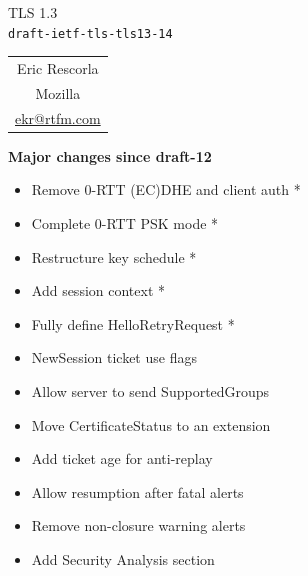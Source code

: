 \documentclass[helvetica]{seminar}
\newcommand{\heading}[1]{%
  \begin{center} 
    \large\bf 
    #1 
  \end{center} 
  \vspace{.4 in}}
\begin{document}
\begin{slide}
\begin{center}
\vspace{.5 in}
\LARGE{{\bf}TLS 1.3\\{\small \verb^draft-ietf-tls-tls13-14^}}\\
\vspace{.2in}
\large{
\begin{tabular}{c}
Eric Rescorla\\
Mozilla\\
\url{ekr@rtfm.com}
\end{tabular}
}
\end{center}
\end{slide}

\centerslidesfalse 

\begin{slide}
\heading{Major changes since draft-12}

\vspace{-8ex}
\begin{itemize}
\item Remove 0-RTT (EC)DHE and client auth *
\item Complete 0-RTT PSK mode *
\item Restructure key schedule *
\item Add session context *
\item Fully define HelloRetryRequest *
\item NewSession ticket use flags
\item Allow server to send SupportedGroups
\item Move CertificateStatus to an extension
\item Add ticket age for anti-replay
\item Allow resumption after fatal alerts
\item Remove non-closure warning alerts
\item Add Security Analysis section
\end{itemize}

\end{slide}
\end{document}
